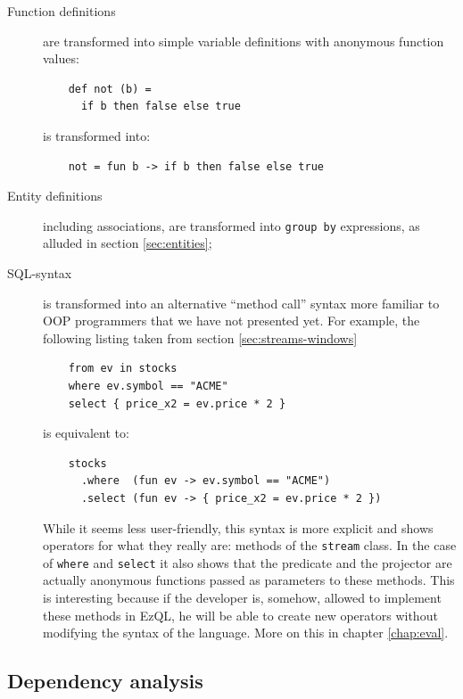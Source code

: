 \begin{description}
\item[Function definitions] are transformed into simple variable
  definitions with anonymous function values:

  \begin{lstlisting}
    def not (b) =
      if b then false else true
  \end{lstlisting}

  is transformed into:

  \begin{lstlisting}
    not = fun b -> if b then false else true
  \end{lstlisting}

\item[Entity definitions] including associations, are transformed into
  \verb=group by= expressions, as alluded in section
  \ref{sec:entities};
\item[SQL-syntax] is transformed into an alternative ``method call''
  syntax more familiar to OOP programmers that we have not presented
  yet. For example, the following listing taken from section
  \ref{sec:streams-windows}

  \begin{lstlisting}
    from ev in stocks
    where ev.symbol == "ACME"
    select { price_x2 = ev.price * 2 }
  \end{lstlisting}

  is equivalent to:

  \begin{lstlisting}
    stocks
      .where  (fun ev -> ev.symbol == "ACME")
      .select (fun ev -> { price_x2 = ev.price * 2 })
  \end{lstlisting}

  While it seems less user-friendly, this syntax is more explicit and
  shows operators for what they really are: methods of the
  \verb=stream= class. In the case of \verb=where= and \verb=select=
  it also shows that the predicate and the projector are actually
  anonymous functions passed as parameters to these methods. This is
  interesting because if the developer is, somehow, allowed to
  implement these methods in EzQL, he will be able to create new
  operators without modifying the syntax of the language. More on this
  in chapter \ref{chap:eval}.

\end{description}

\subsection{Dependency analysis}
\label{sub:dataflow}

